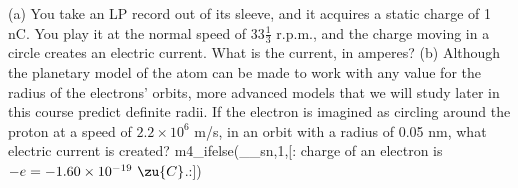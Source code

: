         (a) You take an LP record out of its sleeve, and it
        acquires a static charge of 1 nC.  You play it at the normal
        speed of $33\frac{1}{3}$ r.p.m., and the charge moving in a circle
        creates an electric current.  What is the current, in amperes?
        \answercheck\hwendpart
        (b) Although the planetary model of the atom can be made to
        work with any value for the radius of the electrons' orbits,
        more advanced models that we will study later in this course
        predict definite radii. If the electron is imagined as
        circling around the proton at a speed of $2.2\times10^6$ 
        m/s, in an orbit with a radius of 0.05 nm, what electric current is created?
m4_ifelse(__sn,1,[:%
charge of an electron is $-e=-1.60\times10^{-19}\ \zu{C}$.:])
        \answercheck
